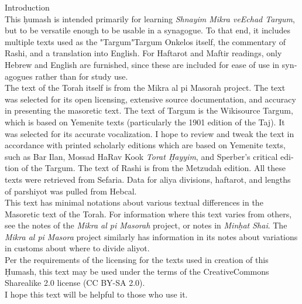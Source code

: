 \begin{minipage}{\textwidth}\englishfont
	
\begin{english}
\vspace{16pt}
\Large Introduction\vspace{12pt}\\
\normalsize
This \d{h}umash is intended primarily for learning \textit{Shnayim Mikra veEchad Targum}, but to be versatile enough to be usable in a synagogue. To that end, it includes multiple texts used as the "Targum"\textemdash Targum Onkelos itself, the commentary of Rashi, and a translation into English.  For Haftarot and Maftir readings, only Hebrew and English are furnished, since these are included for ease of use in synagogues rather than for study use.\\

The text of the Torah itself is from the Mikra al pi Masorah project. The text was selected for its open licensing, extensive source documentation, and accuracy in presenting the masoretic text.  The text of Targum is the Wikisource Targum, which is based on Yemenite texts (particularly the 1901 edition of the Taj). It was selected for its accurate vocalization.  I hope to review and tweak the text in accordance with printed scholarly editions which are based on Yemenite texts, such as Bar Ilan, Mossad HaRav Kook \textit{Torat \d{H}ayyim}, and Sperber's critical edition of the Targum.  The text of Rashi is from the Metzudah edition.  All these texts were retrieved from Sefaria. Data for aliya divisions, haftarot, and lengths of parshiyot was pulled from Hebcal. \\

This text has minimal notations about various textual differences in the Masoretic text of the Torah. For information where this text varies from others, see the notes of the \textit{Mikra al pi Masorah} project, or notes in \textit{Min\d{h}at Shai}. The \textit{Mikra al pi Masora} project similarly has information in its notes about variations in customs about where to divide aliyot.\\

Per the requirements of the licensing for the texts used in creation of this \d{H}umash, this text may be used under the terms of the CreativeCommons Sharealike 2.0 license (CC BY-SA 2.0).\\

I hope this text will be helpful to those who use it.

\end{english}

\end{minipage}


